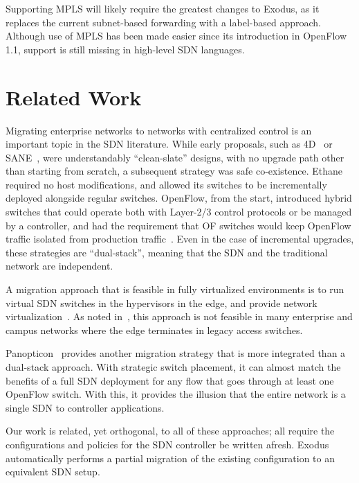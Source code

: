  Supporting MPLS will likely require the greatest changes
to Exodus, as it replaces the current subnet-based forwarding with a label-based approach.
Although use of MPLS has been made easier since its introduction in OpenFlow 1.1,
support is still missing in high-level SDN languages.

\section{Related Work}
\label{sec:relwork}

Migrating enterprise networks to networks with centralized control is
an important topic in the SDN literature. While early proposals, such as 4D~\cite{Greenberg:2005}
 or SANE~\cite{casado06sane}, were understandably ``clean-slate'' designs, with no
upgrade path other than starting from scratch, a subsequent strategy was safe co-existence.
Ethane~\cite{Casado07Ethane} required no host modifications, and allowed its switches to
be incrementally deployed alongside regular switches.
OpenFlow, from the start, introduced hybrid switches that could operate both with Layer-2/3 control
protocols or be managed by a controller, and had the requirement that OF switches would keep 
OpenFlow traffic isolated from production traffic~\cite{McKeown:2008}.
Even in the case of incremental upgrades, these strategies are ``dual-stack'', meaning that
the SDN and the traditional network are independent.

A migration approach that is feasible in fully virtualized
environments is to run virtual SDN switches in the hypervisors in the
edge, and provide network virtualization~\cite{Casado:hotsdn2012-fabric}.  As
noted in~\cite{levin13panopticonTR}, this approach is not feasible in many
enterprise and campus networks where the edge terminates in legacy access
switches.

Panopticon~\cite{levin13panopticonTR} provides another migration strategy that
is more integrated than a dual-stack approach. With strategic switch placement,
it can almost match the benefits of a full SDN deployment
for any flow that goes through at least one OpenFlow switch. With this, it provides
the illusion that the entire network is a single SDN to controller applications.

Our work is related, yet orthogonal, to all of these approaches; all
require the
configurations and policies for the SDN controller be written afresh.
Exodus automatically performs a partial migration of the existing configuration to an equivalent
SDN setup.


